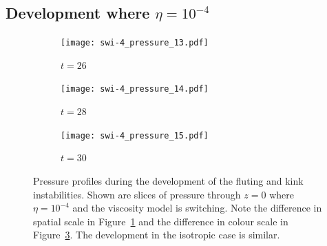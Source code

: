 \subsection{Development where $\eta=10^{-4}$}

\begin{figure}[t]
  \centering
    \begin{subfigure}{0.32\textwidth}
      \texttt{[image: swi-4\_pressure\_13.pdf]}
      \caption{$t=26$}
      \label{fig:swi-4_pressure_13}
    \end{subfigure}
    \hfill
    \begin{subfigure}{0.32\textwidth}
      \texttt{[image: swi-4\_pressure\_14.pdf]}
      \caption{$t=28$}
      \label{fig:swi-4_pressure_14}
    \end{subfigure}
    \hfill
    \begin{subfigure}{0.32\textwidth}
      \texttt{[image: swi-4\_pressure\_15.pdf]}
      \caption{$t=30$}
      \label{fig:swi-4_pressure_15}
    \end{subfigure}
\caption{Pressure profiles during the development of the fluting and kink instabilities. Shown are slices of pressure through $z=0$ where $\eta = 10^{-4}$ and the viscosity model is switching. Note the difference in spatial scale in Figure~\ref{fig:swi-4_pressure_13} and the difference in colour scale in Figure~\ref{fig:swi-4_pressure_15}. The development in the isotropic case is similar.}
\label{fig:kink_pressure_slices-4}%
\end{figure}


